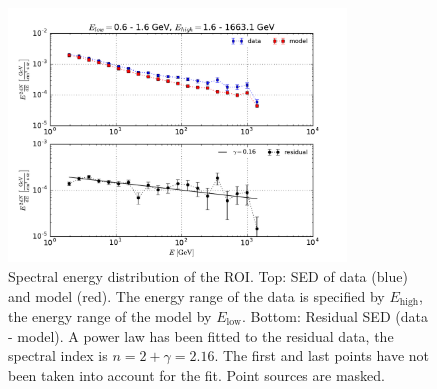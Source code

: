 \documentclass[a4paper]{article}
\begin{document}
\begin{figure}[t]
	\centering
	\includegraphics[width=0.8\textwidth]{Res_SED_b=(-2,2)_l=(-10,-4).pdf}
    \caption{Spectral energy distribution of the ROI. Top: SED of data (blue) and model (red). The energy range of the data is specified by $E_\text{high}$, the energy range of the model by $E_\text{low}$. Bottom: Residual SED (data - model). A power law has been fitted to the residual data, the spectral index is $n = 2 + \gamma = 2.16$. The first and last points have not been taken into account for the fit. Point sources are masked.}
    \label{res_SED}
\end{figure}
 
 
 

 
\end{document}
